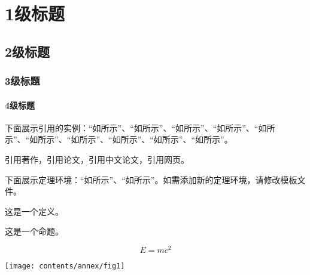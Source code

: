 \chapter{1级标题}\label{cha_one}
\section{2级标题}\label{sec_two}
\subsection{3级标题}\label{subsec_three}
\subsubsection{4级标题}\label{subsubsec_four}

下面展示引用的实例：“如所示”、“如所示”、“如所示”、“如所示”、“如所示”、“如所示”、“如所示”、“如所示”、“如所示”、“如所示”。

引用著作，引用论文，引用中文论文，引用网页。

下面展示定理环境：“如所示”、“如所示”。如需添加新的定理环境，请修改模板文件。
\begin{defn}\label{def_1}
	这是一个定义。
\end{defn}
\begin{prop}\label{prop_2}
	这是一个命题。
\end{prop}

\begin{equation}\label{eq_emc}
	E=mc^2
\end{equation}

\begin{bjtufigure}
\end{bjtufigure}

\begin{bjtufigure}
\texttt{[image: contents/annex/fig1]}
\end{bjtufigure}


